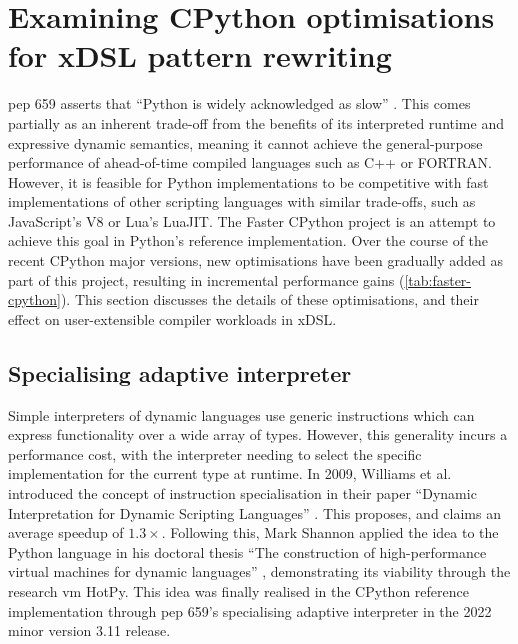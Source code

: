 \chapter{Examining CPython optimisations for xDSL pattern rewriting}
\label{chap:impact-cpython-pattern-rewriting}

\acf{pep} 659 asserts that ``Python is widely acknowledged as slow'' \cite{pep659}.
This comes partially as an inherent trade-off from the benefits of its interpreted runtime and expressive dynamic semantics, meaning it cannot achieve the general-purpose performance of ahead-of-time compiled languages such as C++ or FORTRAN. However, it is feasible for Python implementations to be competitive with fast implementations of other scripting languages with similar trade-offs, such as JavaScript's V8 or Lua's LuaJIT. The Faster CPython project is an attempt to achieve this goal in Python's reference implementation. Over the course of the recent CPython major versions, new optimisations have been gradually added as part of this project, resulting in incremental performance gains (\autoref{tab:faster-cpython}).
This section discusses the details of these optimisations, and their effect on user-extensible compiler workloads in xDSL.


\section{Specialising adaptive interpreter}
\label{sec:specialising-adaptive-interpreter}

Simple interpreters of dynamic languages use generic instructions which can express functionality over a wide array of types. However, this generality incurs a performance cost, with the interpreter needing to select the specific implementation for the current type at runtime.
In 2009, Williams et al. introduced the concept of instruction specialisation in their paper ``Dynamic Interpretation for Dynamic Scripting Languages'' \cite{williamsDynamicInterpretationDynamic2010}.
This proposes, and claims an average speedup of $1.3\times$.
Following this, Mark Shannon applied the idea to the Python language in his doctoral thesis ``The construction of high-performance virtual
machines for dynamic languages'' \cite{shannonConstructionHighperformanceVirtual2011}, demonstrating its viability through the research \ac{vm} HotPy.
This idea was finally realised in the CPython reference implementation through \ac{pep} 659's specialising adaptive interpreter in the 2022 minor version 3.11 release.

